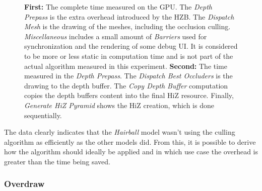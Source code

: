 \begin{figure}[!htb]
  \caption{\textbf{First:} The complete time measured on the \ac{GPU}. The \emph{Depth Prepass} is the extra 
  overhead introduced by the \ac{HZB}. The \emph{Dispatch Mesh} is the drawing of the meshes, including the 
  occlusion culling. \emph{Miscellaneous} includes a small amount of \emph{Barriers} used for synchronization 
  and the rendering of some debug \ac{UI}. It is considered to be more or less static in computation time and 
  is not part of the actual algorithm measured in this experiment. \textbf{Second:} The time measured in the 
  \emph{Depth Prepass}. The \emph{Dispatch Best Occluders} is the drawing to the depth buffer. The 
  \emph{Copy Depth Buffer} computation copies the depth buffers content into the final \ac{HiZ} resource. 
  Finally, \emph{Generate HiZ Pyramid} shows the \ac{HiZ} creation, which is done sequentially.}
  \label{fig:hairball-gpu-times}
\end{figure}

\noindent
The data clearly indicates that the \emph{Hairball} model wasn't using the culling algorithm as efficiently as 
the other models did. From this, it is possible to derive how the algorithm should ideally be applied and in 
which use case the overhead is greater than the time being saved.

\subsubsection*{Overdraw}

